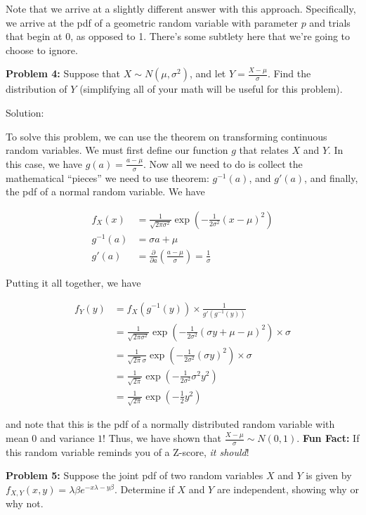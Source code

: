 \documentclass[
  letterpaper,
  DIV=11,
  numbers=noendperiod]{scrreprt}
\begin{document}
Note that we arrive at a slightly different answer with this approach.
Specifically, we arrive at the pdf of a geometric random variable with
parameter \(p\) and trials that begin at 0, as opposed to 1. There's
some subtlety here that we're going to choose to ignore.

\textbf{Problem 4:} Suppose that \(X \sim N(\mu, \sigma^2)\), and let
\(Y = \frac{X - \mu}{\sigma}\). Find the distribution of \(Y\)
(simplifying all of your math will be useful for this problem).

Solution:

To solve this problem, we can use the theorem on transforming continuous
random variables. We must first define our function \(g\) that relates
\(X\) and \(Y\). In this case, we have
\(g(a) = \frac{a - \mu}{\sigma}\). Now all we need to do is collect the
mathematical ``pieces'' we need to use theorem: \(g^{-1}(a)\), and
\(g'(a)\), and finally, the pdf of a normal random variable. We have

\begin{align*}
    f_X(x) & = \frac{1}{\sqrt{2 \pi \sigma^2}} \exp(-\frac{1}{2\sigma^2} (x - \mu)^2) \\
    g^{-1}(a) & = \sigma a + \mu \\
    g'(a) & = \frac{\partial}{\partial a} \left(\frac{a - \mu}{\sigma}\right) = \frac{1}{\sigma}
\end{align*}

Putting it all together, we have

\begin{align*}
    f_Y(y) & = f_X(g^{-1}(y)) \times \frac{1}{g'(g^{-1}(y))} \\
    & = \frac{1}{\sqrt{2 \pi \sigma^2}} \exp(-\frac{1}{2\sigma^2} (\sigma y + \mu - \mu)^2) \times \sigma \\
    & = \frac{1}{\sqrt{2 \pi} \sigma} \exp(-\frac{1}{2\sigma^2} (\sigma y)^2) \times \sigma \\
    & = \frac{1}{\sqrt{2 \pi}} \exp(-\frac{1}{2\sigma^2} \sigma^2 y^2) \\
    & = \frac{1}{\sqrt{2 \pi}} \exp(-\frac{1}{2} y^2)
\end{align*}

and note that this is the pdf of a normally distributed random variable
with mean \(0\) and variance \(1\)! Thus, we have shown that
\(\frac{X - \mu}{\sigma} \sim N(0,1)\). \textbf{Fun Fact:} If this
random variable reminds you of a Z-score, \emph{it should}!

\textbf{Problem 5:} Suppose the joint pdf of two random variables \(X\)
and \(Y\) is given by
\(f_{X,Y}(x,y) = \lambda \beta e^{-x\lambda - y\beta}\). Determine if
\(X\) and \(Y\) are independent, showing why or why not.
\end{document}
